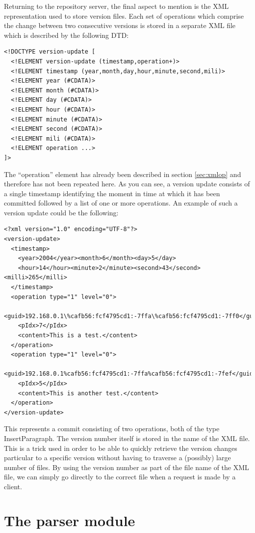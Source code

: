 Returning to the repository server, the final aspect to mention is the XML representation
used to store version files. Each set of operations which comprise the change between two
consecutive versions is stored in a separate XML file which is described by the following
DTD:

\begin{verbatim}
<!DOCTYPE version-update [
  <!ELEMENT version-update (timestamp,operation+)>
  <!ELEMENT timestamp (year,month,day,hour,minute,second,mili)>
  <!ELEMENT year (#CDATA)>
  <!ELEMENT month (#CDATA)>
  <!ELEMENT day (#CDATA)>
  <!ELEMENT hour (#CDATA)>
  <!ELEMENT minute (#CDATA)>
  <!ELEMENT second (#CDATA)>
  <!ELEMENT mili (#CDATA)>
  <!ELEMENT operation ...>
]>
\end{verbatim}

The ``operation'' element has already been described in section \ref{sec:xmlop} and therefore
has not been repeated here. As you can see, a version update consists of a single timestamp
identifying the moment in time at which it has been committed followed by a list of one or
more operations. An example of such a version update could be the following:

\begin{verbatim}
<?xml version="1.0" encoding="UTF-8"?>
<version-update>
  <timestamp>
    <year>2004</year><month>6</month><day>5</day>
    <hour>14</hour><minute>2</minute><second>43</second><milli>265</milli>
  </timestamp>
  <operation type="1" level="0">
    <guid>192.168.0.1\%cafb56:fcf4795cd1:-7ffa\%cafb56:fcf4795cd1:-7ff0</guid>
    <pIdx>7</pIdx>
    <content>This is a test.</content>
  </operation>
  <operation type="1" level="0">
    <guid>192.168.0.1%cafb56:fcf4795cd1:-7ffa%cafb56:fcf4795cd1:-7fef</guid>
    <pIdx>5</pIdx>
    <content>This is another test.</content>
  </operation>
</version-update>
\end{verbatim}

This represents a commit consisting of two operations, both of the type InsertParagraph. The
version number itself is stored in the name of the XML file. This is a trick used in order
to be able to quickly retrieve the version changes particular to a specific version without
having to traverse a (possibly) large number of files. By using the version number as part
of the file name of the XML file, we can simply go directly to the correct file when a
request is made by a client.

\section{The parser module}

